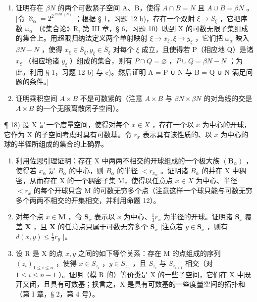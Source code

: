 \begin{enumerate}
\def\labelenumi{\alph{enumi})}
\item
  证明存在 \(\beta N\) 的两个可数紧子空间 A、B，使得 \(A \cap B = N\) 且 \(A \cup B = \beta N\) 。{[}令 \(\aleph_{\alpha} = 2^{2^{\operatorname{Card}(N)}}\) ；根据 § 1，习题 12 b)，存在一个双射 \(\xi \to S_{\xi}\) ，它把序数 \(\omega_{\alpha}\) （《集合论》R, 第 III 章，§ 6，习题 10）映到 X 的可数无限子集组成的集合上。用超限归纳法定义两个单射映射 \(\xi \to x_{\xi}, \xi \to y_{\xi}\) ，它们把 \(\omega_{\alpha}\) 映入 \(\beta N - N\) ，使得 \(x_{\xi} \in \overline{S}_{\xi}, y_{\xi} \in \overline{S}_{\xi}\) 对每个 \(\xi\) 成立，且使得若 P（相应地 Q）是诸 \(x_{\xi}\) （相应地诸 \(y_{\xi}\) ）组成的集合，则有 \(P \cap Q = \varnothing\) ，\(P \cup Q = \beta N - N\) ；为此，利用 § 1，习题 12 b) 与 c)。然后证明 A = P ∪ N 与 B = Q ∪ N 满足问题的条件。{]}
\item
  证明乘积空间 \(A \times B\) 不是可数紧的（注意 \(A \times B\) 与 \(\beta N \times \beta N\) 的对角线的交是 \(A \times B\) 的一个无限离散闭子空间）。
\end{enumerate}

¶ 18) 设 X 是一个度量空间，使得对每个 \(x \in X\) ，存在一个以 \(x\) 为中心的开球，它作为 X 的子空间考虑时具有可数基。令 \(r_x\) 表示具有该性质的、以 \(x\) 为中心的球的半径所组成的集合的上确界。

\begin{enumerate}
\def\labelenumi{\alph{enumi})}
\item
  利用佐恩引理证明：存在 X 中两两不相交的开球组成的一个极大族 \((\mathbf{B}_{\alpha})\) ，使得若 \(x_{\alpha}\) 是 \(B_{\alpha}\) 的中心，则 \(B_{\alpha}\) 的半径 \(<r_{x_{\alpha}}\) 。证明诸 \(B_{\alpha}\) 的并在 X 中稠密，从而存在 X 的一个稠密子集 M，使得以任意点 \(x \in X\) 为中心、半径 \(<r_{x}\) 的每个开球只含 M 的可数无穷多个点（注意这样一个球只能与可数无穷多个两两不相交的开集相交，并利用命题 12）。
\item
  对每个点 \(x \in \mathbf{M}\) ，令 \(\mathbf{S}_x\) 表示以 \(x\) 为中心、\(\frac{1}{3} r_x\) 为半径的开球。证明诸 \(\mathbf{S}_x\) 覆盖 \(\mathbf{X}\) ，且 \(\mathbf{X}\) 的任意点只属于可数无穷多个 \(\mathbf{S}_x\) {[}注意若 \(y \in \mathbf{S}_x\) ，则有 \(d(x, y) \leqslant \frac{1}{2} r_y\) {]}。
\item
  设 R 是 X 的点 \(x, y\) 之间的如下等价关系：存在 M 的点组成的序列 \((z_i)_{1 \leqslant i \leqslant n}\) ，使得 \(x \in S_{z_i}\) ，\(y \in S_{z_n}\) ，且 \(S_{z_i}\) 与 \(S_{z_{i+1}}\) 相交（对 \(1 \leqslant i \leqslant n - 1\) ）。证明（模 R 的）等价类是 X 的一些子空间，它们在 X 中既开又闭，且具有可数基；换言之，X 是具有可数基的一些度量空间的拓扑和（第 I 章，§ 2，第 4 号）。
\end{enumerate}

